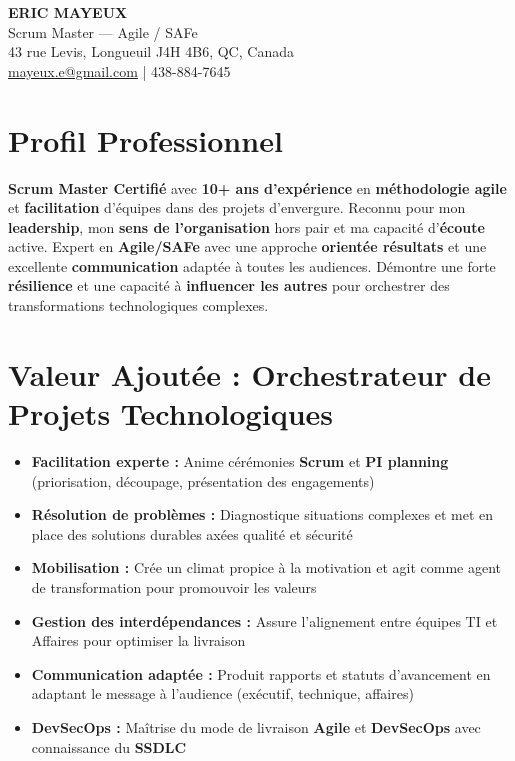 \documentclass[11pt,a4paper]{article}
\newcommand{\highlight}[1]{\textcolor{primaryblue}{\textbf{#1}}}
\newcommand{\keypoint}[1]{\textbf{#1}}
\begin{document}
\begin{center}
    {\LARGE \textbf{ERIC MAYEUX}}\\
    \vspace{2pt}
    {\normalsize Scrum Master — Agile / SAFe}\\
    \vspace{3pt}
    43 rue Levis, Longueuil J4H 4B6, QC, Canada\\
    \href{mailto:mayeux.e@gmail.com}{mayeux.e@gmail.com} | 438-884-7645
\end{center}

\vspace{6pt}

\section*{Profil Professionnel}
\noindent
\highlight{Scrum Master Certifié} avec \keypoint{10+ ans d'expérience} en \highlight{méthodologie agile} et \highlight{facilitation} d'équipes dans des projets d'envergure. Reconnu pour mon \highlight{leadership}, mon \highlight{sens de l'organisation} hors pair et ma capacité d'\highlight{écoute} active. Expert en \highlight{Agile/SAFe} avec une approche \highlight{orientée résultats} et une excellente \highlight{communication} adaptée à toutes les audiences. Démontre une forte \highlight{résilience} et une capacité à \highlight{influencer les autres} pour orchestrer des transformations technologiques complexes.

\section*{Valeur Ajoutée : Orchestrateur de Projets Technologiques}
\begin{itemize}[leftmargin=10pt]
    \item \highlight{Facilitation experte :} Anime cérémonies \highlight{Scrum} et \highlight{PI planning} (priorisation, découpage, présentation des engagements)
    \item \highlight{Résolution de problèmes :} Diagnostique situations complexes et met en place des solutions durables axées qualité et sécurité
    \item \highlight{Mobilisation :} Crée un climat propice à la motivation et agit comme agent de transformation pour promouvoir les valeurs
    \item \highlight{Gestion des interdépendances :} Assure l'alignement entre équipes TI et Affaires pour optimiser la livraison
    \item \highlight{Communication adaptée :} Produit rapports et statuts d'avancement en adaptant le message à l'audience (exécutif, technique, affaires)
    \item \highlight{DevSecOps :} Maîtrise du mode de livraison \highlight{Agile} et \highlight{DevSecOps} avec connaissance du \highlight{SSDLC}
\end{itemize}
\end{document}

